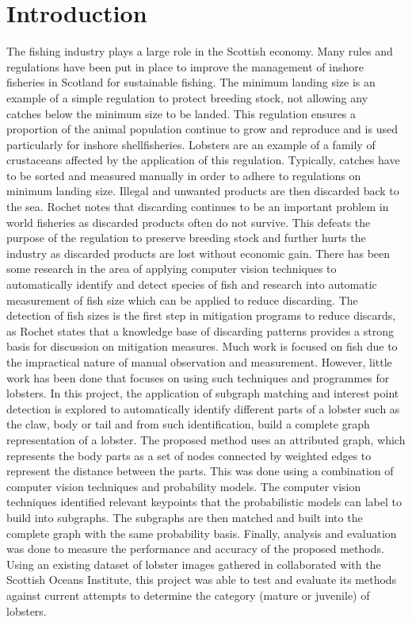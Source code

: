 
\section{Introduction}

The fishing industry plays a large role in the Scottish economy. Many rules and regulations have been put in place to improve the management of inshore fisheries in Scotland for sustainable fishing. The minimum landing size is an example of a simple regulation to protect breeding stock, not allowing any catches below the minimum size to be landed. This regulation ensures a proportion of the animal population continue to grow and reproduce \cite{masts-report} and is used particularly for inshore shellfisheries. Lobsters are an example of a family of crustaceans affected by the application of this regulation. 
\n
Typically, catches have to be sorted and measured manually in order to adhere to regulations on minimum landing size. Illegal and unwanted products are then discarded back to the sea. Rochet \cite{discard} notes that discarding continues to be an important problem in world fisheries as discarded products often do not survive. This defeats the purpose of the regulation to preserve breeding stock and further hurts the industry as discarded products are lost without economic gain. 
\n
There has been some research in the area of applying computer vision techniques to automatically identify and detect species of fish \cite{iobserver, fish-detection, fish-classification} and research into automatic measurement of fish size \cite{fish-size, fish-size2} which can be applied to reduce discarding. The detection of fish sizes is the first step in mitigation programs \cite{discard} to reduce discards, as Rochet states that a knowledge base of discarding patterns provides a strong basis for discussion on mitigation measures. Much work is focused on fish due to the impractical nature of manual observation and measurement. However, little work has been done that focuses on using such techniques and programmes for lobsters. 
\n
In this project, the application of subgraph matching and interest point detection is explored to automatically identify different parts of a lobster such as the claw, body or tail and from such identification, build a complete graph representation of a lobster. The proposed method uses an attributed graph, which represents the body parts as a set of nodes connected by weighted edges to represent the distance between the parts. This was done using a combination of computer vision techniques and probability models. The computer vision techniques identified relevant keypoints that the probabilistic models can label to build into subgraphs. The subgraphs are then matched and built into the complete graph with the same probability basis. Finally, analysis and evaluation was done to measure the performance and accuracy of the proposed methods. Using an existing dataset of lobster images gathered in collaborated with the Scottish Oceans Institute, this project was able to test and evaluate its methods against current attempts to determine the category (mature or juvenile) of lobsters. 

